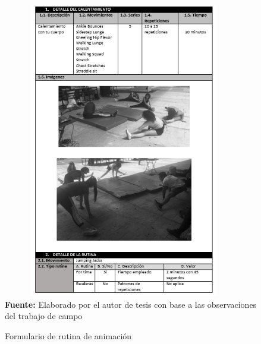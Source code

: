 \begin{figure}[H]
	\caption{Formulario de rutina de animaci\'on}
	\label{fig:frmRoutCher}
	\centering	\includegraphics[width=400px,height=490px]{graphics/resultados/rutina-cheerleaders.PNG} \\
	\textbf{Fuente:} Elaborado por el autor de tesis con base a las observaciones del trabajo de campo
\end{figure}
